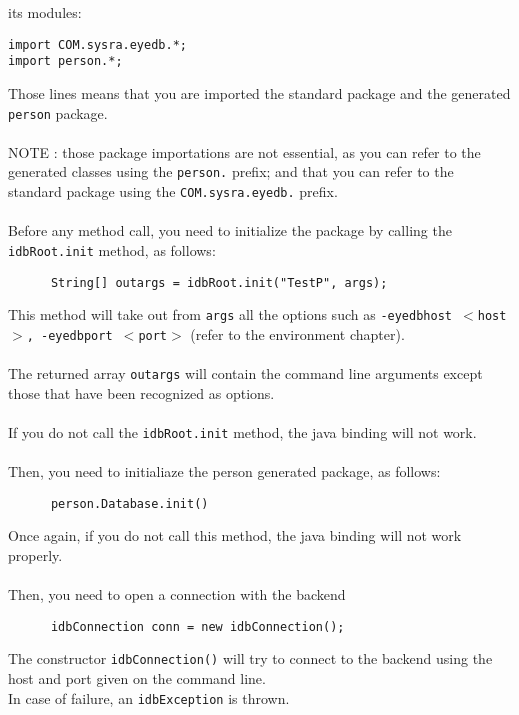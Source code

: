 its modules:
{\verbsize \begin{verbatim}
import COM.sysra.eyedb.*;
import person.*;
\end{verbatim}
}
Those lines means that you are imported the standard \eyedb package
and the generated \texttt{person} package.
\\
\\
NOTE : those package importations are not essential, as you can refer to the
generated classes using the \texttt{person.} prefix; and that you can refer
to the standard \eyedb package using the \texttt{COM.sysra.eyedb.} prefix.
\\
\\
Before any \eyedb method call, you need to initialize the \eyedb
package by calling the \texttt{idbRoot.init} method, as follows:
{\verbsize \begin{verbatim}
      String[] outargs = idbRoot.init("TestP", args);
\end{verbatim}
}
This method will take out from \texttt{args} all the \eyedb options
such as \texttt{-eyedbhost $<$host$>$, -eyedbport $<$port$>$}
(refer to the environment chapter).
\\
\\
The returned array \texttt{outargs} will contain the command line arguments
except those that have been recognized as \eyedb options.
\\
\\
If you do not call the \texttt{idbRoot.init} method, the \eyedb java binding
will not work.
\\
\\
Then, you need to initialiaze the person generated package, as follows:
{\verbsize \begin{verbatim}
      person.Database.init()
\end{verbatim}
}
Once again, if you do not call this method, the \eyedb java binding will
not work properly.
\\
\\
Then, you need to open a connection with the \eyedb backend
{\verbsize \begin{verbatim}
      idbConnection conn = new idbConnection();
\end{verbatim}
}
The constructor \texttt{idbConnection()} will try to connect to the backend
using the host and port given on the command line.
\\
In case of failure, an \texttt{idbException} is thrown.
\\
\\
